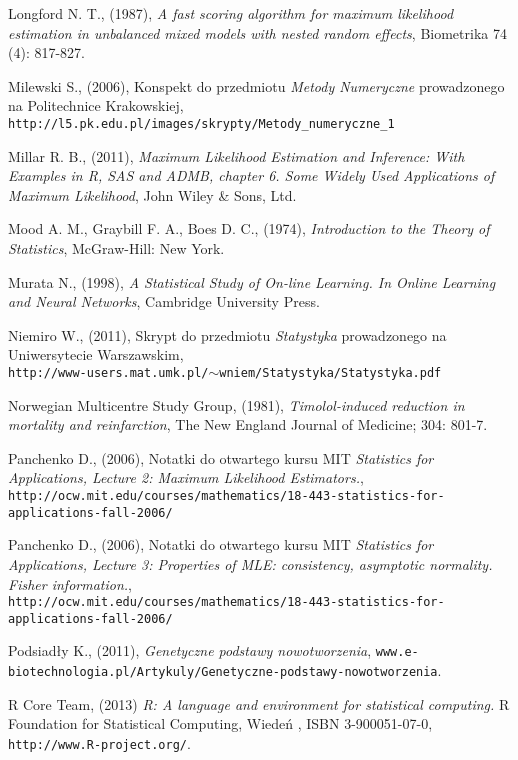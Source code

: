 \begin{thebibliography}{99}
 Longford N. T., (1987), \textit{A fast scoring algorithm for maximum likelihood estimation in unbalanced mixed models with nested random effects}, Biometrika 74 (4): 817-827.

 Milewski S., (2006), Konspekt do przedmiotu \textit{Metody Numeryczne} prowadzonego na Politechnice Krakowskiej, \\ \texttt{http://l5.pk.edu.pl/images/skrypty/Metody\_numeryczne\_1}

 Millar R. B., (2011), \textit{Maximum Likelihood Estimation and Inference: With Examples in R, SAS and ADMB, chapter 6. Some Widely Used Applications of Maximum Likelihood}, John Wiley \& Sons, Ltd.

 Mood A. M., Graybill F. A., Boes D. C., (1974), \textit{Introduction to the Theory of Statistics},
McGraw-Hill: New York.

 Murata N., (1998), \textit{A Statistical Study of On-line Learning. In Online Learning
and Neural Networks}, Cambridge University Press.

 Niemiro W., (2011), Skrypt do przedmiotu \textit{Statystyka} prowadzonego na Uniwersytecie Warszawskim, \\ \texttt{http://www-users.mat.umk.pl/$\sim$wniem/Statystyka/Statystyka.pdf}

 Norwegian Multicentre Study Group, (1981), \textit{Timolol-induced reduction in
mortality and reinfarction}, The New England  Journal of Medicine; 304: 801-7.


 Panchenko D., (2006), Notatki do otwartego kursu MIT \textit{Statistics for Applications, Lecture 2: Maximum Likelihood Estimators.}, \\
\texttt{http://ocw.mit.edu/courses/mathematics/18-443-statistics-for-applications-fall-2006/}

 Panchenko D., (2006), Notatki do otwartego kursu MIT \textit{Statistics for Applications, Lecture 3: Properties of MLE: consistency, asymptotic normality. Fisher information.}, \\
\texttt{http://ocw.mit.edu/courses/mathematics/18-443-statistics-for-applications-fall-2006/}

 Podsiadły K., (2011), \textit{Genetyczne podstawy nowotworzenia}, \texttt{www.e-biotechnologia.pl/Artykuly/Genetyczne-podstawy-nowotworzenia}.

 R Core Team, (2013) \textit{R: A language and environment for statistical computing.} R Foundation for Statistical Computing, Wiedeń , ISBN 3-900051-07-0, \texttt{http://www.R-project.org/}.



\end{thebibliography}
